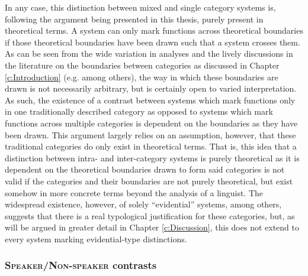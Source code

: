 In any case, this distinction between mixed and single category systems is, following the argument being presented in this thesis, purely present in theoretical terms. A system can only mark functions across theoretical boundaries if those theoretical boundaries have been drawn such that a system crosses them. As can be seen from the wide variation in analyses and the lively discussions in the literature on the boundaries between categories as discussed in Chapter \ref{c:Introduction} (e.g.  among others), the way in which these boundaries are drawn is not necessarily arbitrary, but is certainly open to varied interpretation. As such, the existence of a contrast between systems which mark functions only in one traditionally described category as opposed to systems which mark functions across multiple categories is dependent on the boundaries as they have been drawn. This argument largely relies on an assumption, however, that these traditional categories do only exist in theoretical terms. That is, this idea that a distinction between intra- and inter-category systems is purely theoretical as it is dependent on the theoretical boundaries drawn to form said categories is not valid if the categories and their boundaries are not purely theoretical, but exist somehow in more concrete terms beyond the analysis of a linguist. The widespread existence, however, of solely ``evidential'' systems, among others, suggests that there is a real typological justification for these categories, but, as will be argued in greater detail in Chapter \ref{c:Discussion}, this does not extend to every system marking evidential-type distinctions.




\subsubsection{\textsc{Speaker}/\textsc{Non-speaker} contrasts}\label{sss:Description:SpeakerNonSpeaker}

